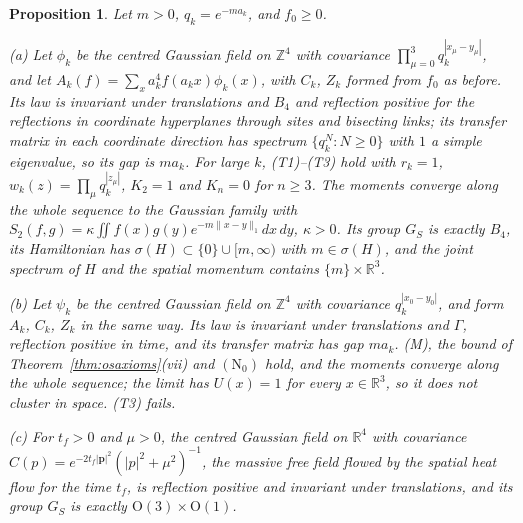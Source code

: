 \documentclass[aps,prd,twocolumn,superscriptaddress,nofootinbib,longbibliography,floatfix,amsmath,amssymb,10pt]{revtex4-2}
\newtheorem{proposition}[theorem]{Proposition}
\theoremstyle{definition}
\theoremstyle{remark}
\newcommand{\R}{\mathbb{R}}
\newcommand{\Z}{\mathbb{Z}}
\begin{document}
\begin{proposition}\label{prop:osobstruction}
Let $m>0$, $q_k=e^{-ma_k}$, and $f_0\ge0$.

\textup{(a)} Let $\phi_k$ be the centred Gaussian field on $\Z^4$ with
covariance $\prod_{\mu=0}^3q_k^{|x_\mu-y_\mu|}$, and let $A_k(f)=\sum_x
a_k^4f(a_kx)\phi_k(x)$, with $C_k$, $Z_k$ formed from $f_0$ as before. Its
law is invariant under translations and $B_4$ and reflection positive for
the reflections in coordinate hyperplanes through sites and bisecting
links; its transfer matrix in each coordinate direction has spectrum
$\{q_k^N:N\ge0\}$ with $1$ a simple eigenvalue, so its gap is $ma_k$. For
large $k$, \textup{(T1)--(T3)} hold with $r_k=1$, $w_k(z)=\prod_\mu
q_k^{|z_\mu|}$, $K_2=1$ and $K_n=0$ for $n\ge3$. The moments converge along
the whole sequence to the Gaussian family with $S_2(f,g)=\kappa\iint
f(x)g(y)e^{-m\|x-y\|_1}dx\,dy$, $\kappa>0$. Its group $G_S$ is exactly
$B_4$, its Hamiltonian has $\sigma(H)\subset\{0\}\cup[m,\infty)$ with
$m\in\sigma(H)$, and the joint spectrum of $H$ and the spatial momentum
contains $\{m\}\times\R^3$.

\textup{(b)} Let $\psi_k$ be the centred Gaussian field on $\Z^4$ with
covariance $q_k^{|x_0-y_0|}$, and form $A_k$, $C_k$, $Z_k$ in the same way.
Its law is invariant under translations and $\Gamma$, reflection positive
in time, and its transfer matrix has gap $ma_k$. \textup{(M)}, the bound of
Theorem~\textup{\ref{thm:osaxioms}(vii)} and $(\mathrm N_0)$ hold, and the
moments converge along the whole sequence; the limit has $U(x)=1$ for every
$x\in\R^3$, so it does not cluster in space. \textup{(T3)} fails.

\textup{(c)} For $t_f>0$ and $\mu>0$, the centred Gaussian field on $\R^4$
with covariance $\widehat C(p)=e^{-2t_f|\mathbf p|^2}(|p|^2+\mu^2)^{-1}$, the
massive free field flowed by the spatial heat flow for the time $t_f$, is
reflection positive and invariant under translations, and its group $G_S$
is exactly $\mathrm O(3)\times\mathrm O(1)$.
\end{proposition}
\end{document}
